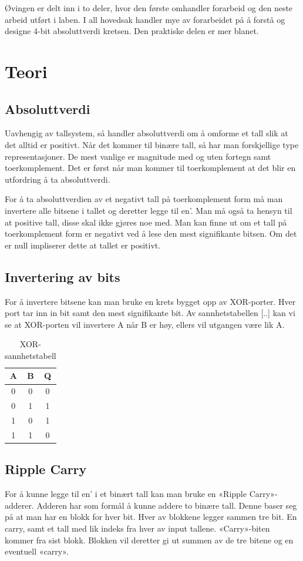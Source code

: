 \documentclass{article}
\begin{document}
Øvingen er delt inn i to deler, hvor den første omhandler forarbeid og den neste arbeid utført i laben. I all hovedsak handler mye av forarbeidet på å forstå og designe 4-bit absoluttverdi kretsen. Den praktiske delen er mer blanet.
\section{Teori}
\subsection{Absoluttverdi}
Uavhengig av tallsystem, så handler absoluttverdi om å omforme et tall slik at det alltid er positivt. Når det kommer til binære tall, så har man forskjellige type representasjoner. De mest vanlige er magnitude med og uten fortegn samt toerkomplement. Det er først når man kommer til toerkomplement at det blir en utfordring å ta absoluttverdi.

For å ta absoluttverdien av et negativt tall på toerkomplement form må man invertere alle bitsene i tallet og deretter legge til en’. Man må også ta hensyn til at positive tall, disse skal ikke gjøres noe med. Man kan finne ut om et tall på toerkomplement form er negativt ved å lese den mest signifikante bitsen. Om det er null impliserer dette at tallet er positivt.

\subsection{Invertering av bits}
For å invertere bitsene kan man bruke en krets bygget opp av XOR-porter. Hver port tar inn in bit samt den mest signifikante bit. Av sannhetstabellen [..] kan vi se at XOR-porten vil invertere A når B er høy, ellers vil utgangen være lik A.

\begin{table}[h]
	\centering
	\caption{XOR-sannhetstabell}
	\label{my-label}
	\vspace{0.2cm}
	\begin{tabular}{| c | c | c |} \hline
		A & B & Q \\ \hline
		0 & 0 & 0 \\ \hline
		0 & 1 & 1 \\ \hline
		1 & 0 & 1 \\ \hline
		1 & 1 & 0 \\ \hline
	\end{tabular}
\end{table}

\subsection{Ripple Carry}
For å kunne legge til en’ i et binært tall kan man bruke en «Ripple Carry»-adderer. Adderen har som formål å kunne addere to binære tall. Denne baser seg på at man har en blokk for hver bit. Hver av blokkene legger sammen tre bit. En carry, samt et tall med lik indeks fra hver av input tallene. «Carry»-biten kommer fra sist blokk. Blokken vil deretter gi ut summen av de tre bitene og en eventuell «carry».
\end{document}
